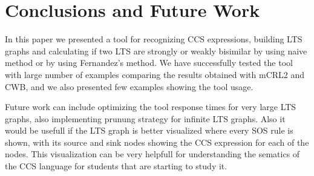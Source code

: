\section{Conclusions and Future Work}
In this paper we presented a tool for recognizing CCS expressions, building LTS graphs and calculating if two LTS are strongly or weakly bisimilar
by using naive method or by using Fernandez's method. We have successfully tested the tool with large number of examples comparing the results obtained with mCRL2 and CWB, and we also presented few examples showing the tool usage. 

Future work can include optimizing the tool response times for very large LTS graphs, also implementing prunung strategy for infinite LTS graphs. 
Also it would be usefull if the LTS graph is better visualized where every SOS rule is shown, with its source and sink nodes showing the CCS expression for each of the nodes. This visualization can be very helpfull for understanding the sematics of the CCS language for students that are starting to study it.
